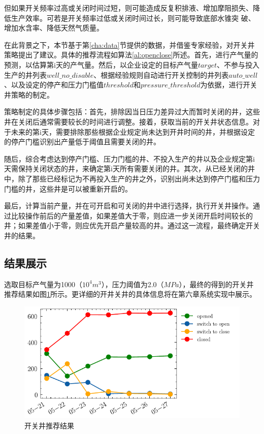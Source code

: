 但如果开关频率过高或关闭时间过短，则可能造成反复积排液、增加摩阻损失、降低生产效率。可若是开关频率过低或关闭时间过长，则可能导致底部水锥突
破、增加水含率、降低天然气质量。

在此背景之下，本节基于第\ref{cha:data}节提供的数据，并借鉴专家经验，对开关井策略提出了建议。具体的推荐流程如算法\ref{al:openclose}所述。首先，进行产气量的预测，以估算第i天的产气量。然后，以企业设定的目标产气量$target$、不参与投入生产的井列表$well\_no\_disable$、根据经验规则自动进行开关控制的井列表$auto\_well$、以及设定的停产和压力门槛值$threshold$和$pressure\_threshold$为依据，进行开关井策略的制定。

策略制定的具体步骤包括：首先，排除因当日压力差异过大而暂时关闭的井，这些井在关闭后通常需要较长的时间进行调整。接着，获取当前的开关井状态信息。对于未来的第i天，需要排除那些根据企业规定尚未达到开井时间的井，并根据设定的停产门槛识别出产量低于阈值且需要关闭的井。

随后，综合考虑达到停产门槛、压力门槛的井、不投入生产的井以及企业规定第i天需保持关闭状态的井，来确定第i天所有需要关闭的井。其次，从已经关闭的井中，除了那些已经标记为不再投入生产的井之外，识别出尚未达到停产门槛和压力门槛的井，这些井是可以被重新开启的。

最后，计算当前产量，并在可开启和可关闭的井中进行选择，执行开关井操作。通过比较操作前后的产量差值，如果差值大于零，则应进一步关闭开启时间较长的井；如果差值小于零，则应优先开启产量较高的井。通过这一流程，最终确定开关井的结果。

\subsection{结果展示}
选取目标产气量为1000（$10^4m^3$），压力阈值为2.0（$MPa$），最终的得到的开关井推荐结果如图\ref{fig:openclosereco}所示。更详细的开井关井的具体信息将在第六章系统实现中展示。
\begin{figure}[H]
    \centering
    \includegraphics[width=.8\linewidth]{figure/reco.pdf}
    \caption{开关井推荐结果}
    \label{fig:openclosereco}
\end{figure}

